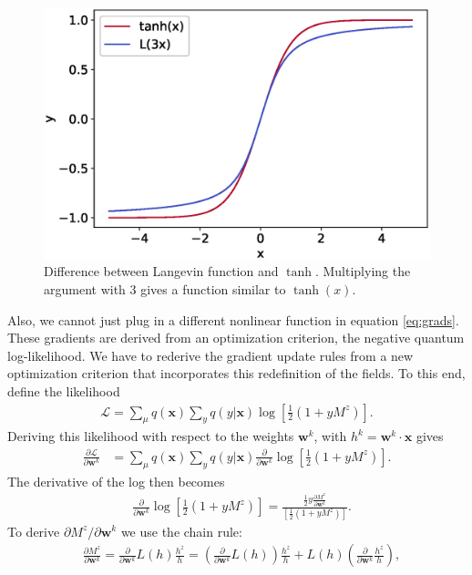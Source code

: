 \begin{figure}[ht]
    \centering
    \includegraphics[width=\textwidth]{figures/chapter3/langevin_tanh.eps}
    \caption{Difference between Langevin function and $\tanh$. Multiplying the argument with 3 gives a function similar to $\tanh(x)$.}
    \label{fig:langevin}
\end{figure}
Also, we cannot just plug in a different nonlinear function in equation \ref{eq:grads}. These gradients are derived from an optimization criterion, the negative quantum log-likelihood. We have to rederive the gradient update rules from a new optimization criterion that incorporates this redefinition of the fields. To this end, define the likelihood
\begin{align*}
    \mathcal{L} = \sum_\mu q(\mathbf{x}) \sum_y q(y|\mathbf{x}) \log [\frac{1}{2}(1+y M^z)].
\end{align*}
Deriving this likelihood with respect to the weights $\mathbf{w}^k$, with $h^k = \mathbf{w}^k \cdot \mathbf{x}$ gives
\begin{align*}
    \frac{\partial \mathcal{L}}{\partial \mathbf{w}^k} &= \sum_\mu q(\mathbf{x}) \sum_y q(y|\mathbf{x})\frac{\partial}{\partial \mathbf{w}^k} \log [\frac{1}{2}(1+y M^z)].
\end{align*}
The derivative of the log then becomes
\begin{align*}
    &\frac{\partial}{\partial \mathbf{w}^k} \log [\frac{1}{2}(1+y M^z)]  =  \frac{\frac{1}{2}y\frac{\partial M^z}{\partial \mathbf{w}^k}}{[\frac{1}{2}(1+y M^z)] }.
\end{align*}
To derive $\partial M^z / \partial \mathbf{w}^k$ we use the chain rule:
\begin{align*}
    &\frac{\partial M^z}{\partial \mathbf{w}^k} =\frac{\partial}{\partial \mathbf{w}^k}L(h) \frac{h^z}{h} = \left(\frac{\partial}{\partial \mathbf{w}^k} L(h)\right)\frac{h^z}{h}  +  L(h)\left(\frac{\partial}{\partial \mathbf{w}^k}\frac{h^z}{h} \right),
\end{align*}
